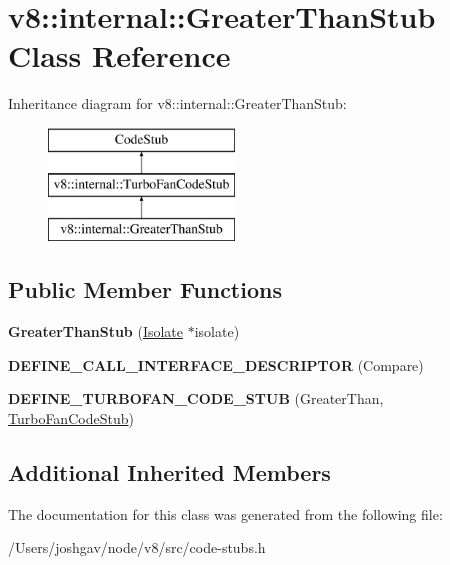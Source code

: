 \hypertarget{classv8_1_1internal_1_1_greater_than_stub}{}\section{v8\+:\+:internal\+:\+:Greater\+Than\+Stub Class Reference}
\label{classv8_1_1internal_1_1_greater_than_stub}
Inheritance diagram for v8\+:\+:internal\+:\+:Greater\+Than\+Stub\+:\begin{figure}[H]
\begin{center}
\leavevmode
\includegraphics[height=3.000000cm]{classv8_1_1internal_1_1_greater_than_stub}
\end{center}
\end{figure}
\subsection*{Public Member Functions}
\begin{DoxyCompactItemize}
\item 
{\bfseries Greater\+Than\+Stub} (\hyperlink{classv8_1_1internal_1_1_isolate}{Isolate} $\ast$isolate)\hypertarget{classv8_1_1internal_1_1_greater_than_stub_aab70ecd940d937d1af5e8e4a1f42f3c1}{}\label{classv8_1_1internal_1_1_greater_than_stub_aab70ecd940d937d1af5e8e4a1f42f3c1}

\item 
{\bfseries D\+E\+F\+I\+N\+E\+\_\+\+C\+A\+L\+L\+\_\+\+I\+N\+T\+E\+R\+F\+A\+C\+E\+\_\+\+D\+E\+S\+C\+R\+I\+P\+T\+OR} (Compare)\hypertarget{classv8_1_1internal_1_1_greater_than_stub_ae2a0d78e9950b8da84a284050e35722f}{}\label{classv8_1_1internal_1_1_greater_than_stub_ae2a0d78e9950b8da84a284050e35722f}

\item 
{\bfseries D\+E\+F\+I\+N\+E\+\_\+\+T\+U\+R\+B\+O\+F\+A\+N\+\_\+\+C\+O\+D\+E\+\_\+\+S\+T\+UB} (Greater\+Than, \hyperlink{classv8_1_1internal_1_1_turbo_fan_code_stub}{Turbo\+Fan\+Code\+Stub})\hypertarget{classv8_1_1internal_1_1_greater_than_stub_ab7dd3873d986483de8aab3c75268f41b}{}\label{classv8_1_1internal_1_1_greater_than_stub_ab7dd3873d986483de8aab3c75268f41b}

\end{DoxyCompactItemize}
\subsection*{Additional Inherited Members}


The documentation for this class was generated from the following file\+:\begin{DoxyCompactItemize}
\item 
/\+Users/joshgav/node/v8/src/code-\/stubs.\+h\end{DoxyCompactItemize}
